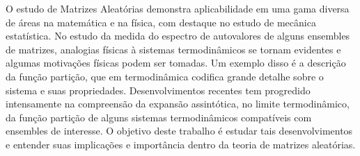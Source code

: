 O estudo de Matrizes Aleatórias demonstra aplicabilidade em uma gama diversa de áreas na matemática e na física, com destaque no estudo de mecânica estatística. No estudo da medida do espectro de autovalores de alguns ensembles de matrizes, analogias físicas à sistemas termodinâmicos se tornam evidentes e algumas motivações físicas podem ser tomadas. Um exemplo disso é a descrição da função partição, que em termodinâmica codifica grande detalhe sobre o sistema e suas propriedades. Desenvolvimentos recentes tem progredido intensamente na compreensão da expansão assintótica, no limite termodinâmico, da função partição de alguns sistemas termodinâmicos compatíveis com ensembles de interesse. O objetivo deste trabalho é estudar tais desenvolvimentos e entender suas implicações e importância dentro da teoria de matrizes aleatórias.
